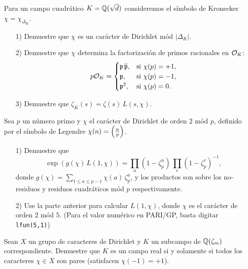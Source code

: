 \begin{ejercicio}
  \label{ejerc:caracter-para-campo-cuadratico}
  Para un campo cuadrático $K = \mathbb{Q} (\sqrt{d})$ consideremos el símbolo de
  Kronecker $\chi = \chi_{\Delta_K}$.

  \begin{enumerate}
  \item[1)] Demuestre que $\chi$ es un carácter de Dirichlet mód $|\Delta_K|$.

  \item[2)] Demuestre que $\chi$ determina la factorización de primos
    racionales en $\mathcal{O}_K$:
    \[ p\mathcal{O}_K = \begin{cases}
      \mathfrak{p}\,\overline{\mathfrak{p}}, & \text{si } \chi (p) = +1,\\
      \mathfrak{p}, & \text{si } \chi (p) = -1,\\
      \mathfrak{p}^2, & \text{si } \chi (p) = 0.
    \end{cases} \]

  \item[3)] Demuestre que $\zeta_K (s) = \zeta (s) \, L (s,\chi)$.
  \end{enumerate}
\end{ejercicio}

\begin{ejercicio}
  \label{ejerc:L-series-caracter-cuadratico-mod-p}
  Sea $p$ un número primo y $\chi$ el carácter de Dirichlet de orden $2$ mód
  $p$, definido por el símbolo de Legendre $\chi (n) = \left(\frac{n}{p}\right)$.

  \begin{enumerate}
  \item[1)] Demuestre que
    $$\exp (g (\chi)\,L (1,\chi)) = \prod_n (1 - \zeta_p^n)\,\prod_r (1 - \zeta_p^r)^{-1},$$
    donde $g (\chi) = \sum_{1 \le a
      \le p-1} \chi (a)\,\zeta_p^a$, y los productos son sobre los no-residuos y
    residuos cuadráticos mód $p$ respectivamente.

  \item[2)] Use la parte anterior para calcular $L (1,\chi)$, donde $\chi$ es el
    carácter de orden $2$ mód $5$.  (Para el valor numérico en PARI/GP, basta
    digitar \texttt{lfun(5,1)})
  \end{enumerate}
\end{ejercicio}

\iffalse
\begin{ejercicio}
  Sean $X$ un grupo de caracteres de Dirichlet y $K$ un subcampo de
  $\mathbb{Q} (\zeta_m)$ correspondiente. Demuestre que $K$ es un campo real si y
  solamente si todos los caracteres $\chi \in X$ son pares (satisfacen
  $\chi (-1) = +1$).
\end{ejercicio}

